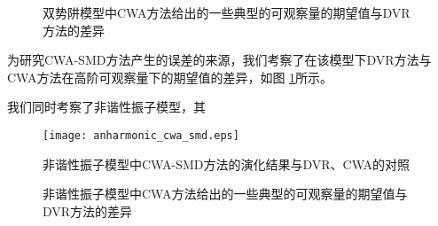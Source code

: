 \begin{figure}
\centering
{}
\caption{双势阱模型中CWA方法给出的一些典型的可观察量的期望值与DVR方法的差异}
\label{exp-error}
\end{figure}
为研究CWA-SMD方法产生的误差的来源，我们考察了在该模型下DVR方法与CWA方法在高阶可观察量下的期望值的差异，如图 \ref{exp-error}所示。

我们同时考察了非谐性振子模型，其


\begin{figure}
\centering
\texttt{[image: anharmonic\_cwa\_smd.eps]}
\caption{非谐性振子模型中CWA-SMD方法的演化结果与DVR、CWA的对照}
\label{cwa-smd-double-well}
\end{figure}

\begin{figure}
\centering
{}
\caption{非谐性振子模型中CWA方法给出的一些典型的可观察量的期望值与DVR方法的差异}
\label{exp-error-anharmonic}
\end{figure}
